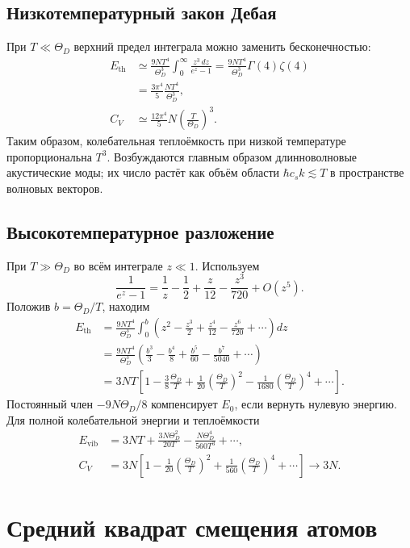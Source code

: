 \documentclass[../final.tex]{subfiles}
\begin{document}
\subsection{Низкотемпературный закон Дебая}
При $T\ll\Theta_D$ верхний предел интеграла можно заменить бесконечностью:
\begin{align*}
 E_{\mathrm{th}}&\simeq\frac{9NT^4}{\Theta_D^3}
 \int_0^\infty\frac{z^3\,dz}{e^z-1}
 =\frac{9NT^4}{\Theta_D^3}\Gamma(4)\zeta(4)\\
 &=\frac{3\pi^4}{5}\frac{NT^4}{\Theta_D^3},\\
 C_V&\simeq\frac{12\pi^4}{5}N\left(\frac{T}{\Theta_D}\right)^3.
\end{align*}
Таким образом, колебательная теплоёмкость при низкой температуре
пропорциональна $T^3$. Возбуждаются главным образом длинноволновые
акустические моды; их число растёт как объём области $\hbar c_sk\lesssim T$
в пространстве волновых векторов.

\subsection{Высокотемпературное разложение}
При $T\gg\Theta_D$ во всём интеграле $z\ll1$. Используем
\begin{equation*}
 \frac1{e^z-1}=\frac1z-\frac12+\frac z{12}-\frac{z^3}{720}+O(z^5).
\end{equation*}
Положив $b=\Theta_D/T$, находим
\begin{align*}
 E_{\mathrm{th}}
 &=\frac{9NT^4}{\Theta_D^3}\int_0^b
 \left(z^2-\frac{z^3}{2}+\frac{z^4}{12}-\frac{z^6}{720}+\cdots\right)dz\\
 &=\frac{9NT^4}{\Theta_D^3}
 \left(\frac{b^3}{3}-\frac{b^4}{8}+\frac{b^5}{60}-\frac{b^7}{5040}+\cdots\right)\\
 &=3NT\left[1-\frac38\frac{\Theta_D}{T}
 +\frac1{20}\left(\frac{\Theta_D}{T}\right)^2
 -\frac1{1680}\left(\frac{\Theta_D}{T}\right)^4+\cdots\right].
\end{align*}
Постоянный член $-9N\Theta_D/8$ компенсирует $E_0$, если вернуть
нулевую энергию. Для полной колебательной энергии и теплоёмкости
\begin{align*}
 E_{\mathrm{vib}}&=3NT+\frac{3N\Theta_D^2}{20T}
 -\frac{N\Theta_D^4}{560T^3}+\cdots,\\
 C_V&=3N\left[1-\frac1{20}\left(\frac{\Theta_D}{T}\right)^2
 +\frac1{560}\left(\frac{\Theta_D}{T}\right)^4+\cdots\right]
 \longrightarrow3N.
\end{align*}

\clearpage
\section{Средний квадрат смещения атомов}
\end{document}
